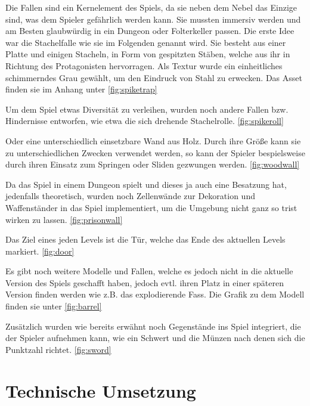 \documentclass[10pt]{article}
\begin{document}
\noindent Die Fallen sind ein Kernelement des Spiels, da sie neben dem Nebel das Einzige sind, was dem Spieler gefährlich werden kann. Sie mussten immersiv werden und am Besten glaubwürdig
in ein Dungeon oder Folterkeller passen. Die erste Idee war die Stachelfalle wie sie im Folgenden genannt wird. Sie besteht aus einer Platte und einigen Stacheln, in Form von gespitzten
Stäben, welche aus ihr in Richtung des Protagonisten hervorragen. Als Textur wurde ein einheitliches schimmerndes Grau gewählt, um den Eindruck von Stahl zu erwecken. Das Asset finden
sie im Anhang unter \ref{fig:spiketrap}\newline

\noindent Um dem Spiel etwas Diversität zu verleihen, wurden noch andere Fallen bzw. Hindernisse entworfen, wie etwa die sich drehende Stachelrolle. \ref{fig:spikeroll}\newline

\noindent Oder eine unterschiedlich einsetzbare Wand aus Holz. Durch ihre Größe kann sie zu unterschiedlichen Zwecken verwendet werden, so kann der Spieler bespielsweise durch ihren Einsatz zum 
Springen oder Sliden gezwungen werden. \ref{fig:woodwall}\newline

\noindent Da das Spiel in einem Dungeon spielt und dieses ja auch eine Besatzung hat, jedenfalls theoretisch, wurden noch Zellenwände zur Dekoration und Waffenständer in das Spiel implementiert,
um die Umgebung nicht ganz so trist wirken zu lassen. \ref{fig:prisonwall}\newline

\noindent Das Ziel eines jeden Levels ist die Tür, welche das Ende des aktuellen Levels markiert. \ref{fig:door}\newline

\noindent Es gibt noch weitere Modelle und Fallen, welche es jedoch nicht in die aktuelle Version des Spiels geschafft haben, jedoch evtl. ihren Platz in einer späteren Version finden werden wie z.B. das
explodierende Fass. Die Grafik zu dem Modell finden sie unter \ref{fig:barrel}\newline

\noindent Zusätzlich wurden wie bereits erwähnt noch Gegenstände ins Spiel integriert, die der Spieler aufnehmen kann, wie ein Schwert und die Münzen nach denen sich die Punktzahl richtet. \ref{fig:sword}\newline

\newpage
\section{Technische Umsetzung}
\end{document}
